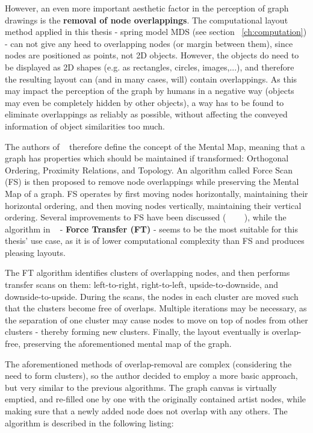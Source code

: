 However, an even more important aesthetic factor in the perception of graph drawings is the \textbf{removal of node overlappings}. The computational layout method applied in this thesis - spring model MDS (see section ~\ref{ch:computation}) - can not give any heed to overlapping nodes (or margin between them), since nodes are positioned as points, not 2D objects. However, the objects do need to be displayed as 2D shapes (e.g. as rectangles, circles, images,...), and therefore the resulting layout can (and in many cases, will) contain overlappings.
As this may impact the perception of the graph by humans in a negative way (objects may even be completely hidden by other objects), a way has to be found to eliminate overlappings as reliably as possible, without affecting the conveyed information of object similarities too much.

The authors of ~\cite{journals/vlc/MisueELS95} therefore define the concept of the Mental Map, meaning that a graph has properties which should be maintained if transformed: Orthogonal Ordering, Proximity Relations, and Topology. An algorithm called Force Scan (FS) is then proposed to remove node overlappings while preserving the Mental Map of a graph. FS operates by first moving nodes horizontally, maintaining their horizontal ordering, and then moving nodes vertically, maintaining their vertical ordering. Several improvements to FS have been discussed (~\cite{Hayashi:1998:LAP:647550.728930} ~\cite{Huang03force-transfer:a} ~\cite{Li:2005}), while the algorithm in ~\cite{Huang03force-transfer:a} - \textbf{Force Transfer (FT)} - seems to be the most suitable for this thesis' use case, as it is of lower computational complexity than FS and produces pleasing layouts.

The FT algorithm identifies clusters of overlapping nodes, and then performs transfer scans on them: left-to-right, right-to-left, upside-to-downside, and downside-to-upside. During the scans, the nodes in each cluster are moved such that the clusters become free of overlaps. Multiple iterations may be necessary, as the separation of one cluster may cause nodes to move on top of nodes from other clusters - thereby forming new clusters. Finally, the layout eventually is overlap-free, preserving the aforementioned mental map of the graph.

The aforementioned methods of overlap-removal are complex (considering the need to form clusters), so the author decided to employ a more basic approach, but very similar to the previous algorithms. The graph canvas is virtually emptied, and re-filled one by one with the originally contained artist nodes, while making sure that a newly added node does not overlap with any others. The algorithm is described in the following listing:

